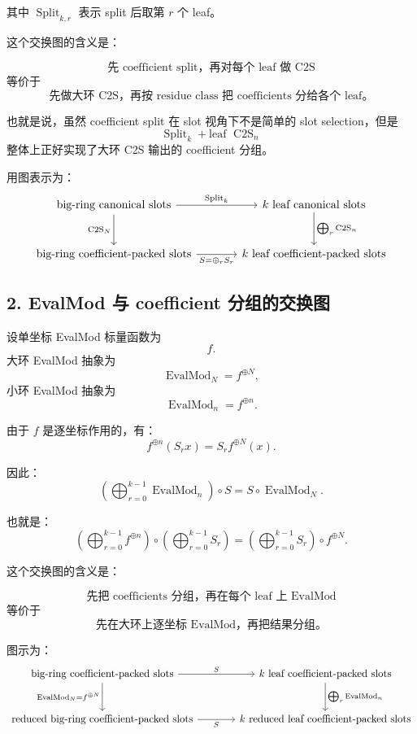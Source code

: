 \documentclass[UTF8,11pt]{ctexart}
\theoremstyle{definition}
\newcommand{\CtwoS}{\operatorname{C2S}}
\newcommand{\Split}{\operatorname{Split}}
\newcommand{\EvalMod}{\operatorname{EvalMod}}
\begin{document}
其中 \(\Split_{k,r}\) 表示 split 后取第 \(r\) 个 leaf。

这个交换图的含义是：

\[
\text{先 coefficient split，再对每个 leaf 做 C2S}
\]
等价于
\[
\text{先做大环 C2S，再按 residue class 把 coefficients 分给各个 leaf。}
\]

也就是说，虽然 coefficient split 在 slot 视角下不是简单的 slot selection，但是
\[
\Split_k+\text{leaf }\CtwoS_n
\]
整体上正好实现了大环 C2S 输出的 coefficient 分组。

用图表示为：
\[
\begin{tikzcd}[column sep=large,row sep=large]
\text{big-ring canonical slots}
    \arrow[r,"\Split_k"]
    \arrow[d,"\CtwoS_N"']
&
\text{\(k\) leaf canonical slots}
    \arrow[d,"\bigoplus_r \CtwoS_n"]
\\
\text{big-ring coefficient-packed slots}
    \arrow[r,"S=\oplus_r S_r"']
&
\text{\(k\) leaf coefficient-packed slots}
\end{tikzcd}
\]

\subsection*{2. EvalMod 与 coefficient 分组的交换图}

设单坐标 EvalMod 标量函数为
\[
f.
\]
大环 EvalMod 抽象为
\[
\EvalMod_N=f^{\oplus N},
\]
小环 EvalMod 抽象为
\[
\EvalMod_n=f^{\oplus n}.
\]

由于 \(f\) 是逐坐标作用的，有：
\[
f^{\oplus n}(S_rx)=S_rf^{\oplus N}(x).
\]

因此：
\[
\boxed{
\left(
\bigoplus_{r=0}^{k-1}\EvalMod_n
\right)
\circ
S
=
S
\circ
\EvalMod_N.
}
\]

也就是：
\[
\boxed{
\left(
\bigoplus_{r=0}^{k-1} f^{\oplus n}
\right)
\circ
\left(
\bigoplus_{r=0}^{k-1}S_r
\right)
=
\left(
\bigoplus_{r=0}^{k-1}S_r
\right)
\circ
f^{\oplus N}.
}
\]

这个交换图的含义是：

\[
\text{先把 coefficients 分组，再在每个 leaf 上 EvalMod}
\]
等价于
\[
\text{先在大环上逐坐标 EvalMod，再把结果分组。}
\]

图示为：
\[
\begin{tikzcd}[column sep=large,row sep=large]
\text{big-ring coefficient-packed slots}
    \arrow[r,"S"]
    \arrow[d,"\EvalMod_N=f^{\oplus N}"']
&
\text{\(k\) leaf coefficient-packed slots}
    \arrow[d,"\bigoplus_r \EvalMod_n"]
\\
\text{reduced big-ring coefficient-packed slots}
    \arrow[r,"S"']
&
\text{\(k\) reduced leaf coefficient-packed slots}
\end{tikzcd}
\]
\end{document}

